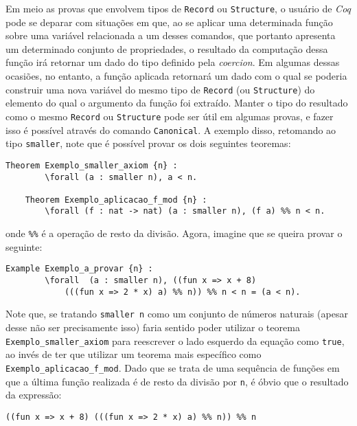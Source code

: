 Em meio as provas que envolvem tipos de \lstinline[language = coq]$Record$ ou \lstinline[language = coq]$Structure$, o usuário de \textit{Coq} pode se deparar com situações em que, ao se aplicar uma determinada função sobre uma variável relacionada a um desses comandos, que portanto apresenta um determinado conjunto de propriedades, o resultado da computação dessa função irá retornar um dado do tipo definido pela \textit{coercion}. Em algumas dessas ocasiões, no entanto, a função aplicada retornará um dado com o qual se poderia construir uma nova variável do mesmo tipo de \lstinline[language = coq]$Record$ (ou \lstinline[language = coq]$Structure$) do elemento do qual o argumento da função foi extraído. Manter o tipo do resultado como o mesmo \lstinline[language = coq]$Record$ ou \lstinline[language = coq]$Structure$ pode ser útil em algumas provas, e fazer isso é possível através do comando \lstinline[language = coq]$Canonical$. A exemplo disso, retomando ao tipo \lstinline[language = coq]$smaller$, note que é possível provar os dois seguintes teoremas:
\begin{lstlisting}[language = coq]
    Theorem Exemplo_smaller_axiom {n} :
        \forall (a : smaller n), a < n.

    Theorem Exemplo_aplicacao_f_mod {n} :
        \forall (f : nat -> nat) (a : smaller n), (f a) %% n < n.
\end{lstlisting}
onde \lstinline[language = coq]$%%$ é a operação de resto da divisão. Agora, imagine que se queira provar o seguinte:
\begin{lstlisting}[language = coq]
    Example Exemplo_a_provar {n} :
        \forall  (a : smaller n), ((fun x => x + 8) 
            (((fun x => 2 * x) a) %% n)) %% n < n = (a < n).
\end{lstlisting}
Note que, se tratando \lstinline[language = coq]!smaller n! como um conjunto de números naturais (apesar desse não ser precisamente isso) faria sentido poder utilizar o teorema 
\lstinline[language = coq]!Exemplo_smaller_axiom!
para reescrever o lado esquerdo da equação como \lstinline[language = coq]!true!, ao invés de ter que utilizar um teorema mais específico como \lstinline[language = coq]!Exemplo_aplicacao_f_mod!. Dado que se trata de uma sequência de funções em que a última função realizada é de resto da divisão por \lstinline[language = coq]!n!, é óbvio que o resultado da expressão:
\begin{lstlisting}[language = coq]
    ((fun x => x + 8) (((fun x => 2 * x) a) %% n)) %% n
\end{lstlisting} 
